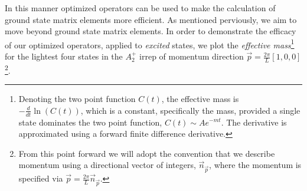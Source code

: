 
In this manner optimized operators can be used to make the calculation of ground state matrix elements more efficient. As mentioned perviously, we aim to move beyond ground state matrix elements. In order to demonstrate the efficacy of our optimized operators, applied to \emph{excited} states, we plot the \emph{effective mass}\footnote{Denoting the two point function $C(t)$, the effective mass is $-\frac{d}{dt} \ln(C(t))$, which is a constant, specifically the mass, provided a single state dominates the two point function, $C(t)\sim Ae^{-mt}$. The derivative is approximated using a forward finite difference derivative.} for the lightest four states in the $A_2^+$ irrep of momentum direction $\vec{p} = \frac{2\pi}{L}[1,0,0]$\footnote{From this point forward we will adopt the convention that we describe momentum using a directional vector of integers, $\vec{n}_{\vec{p}}$, where the momentum is specified via $\vec{p} = \frac{2\pi}{L}\vec{n}_{\vec{p}}$.}.  

